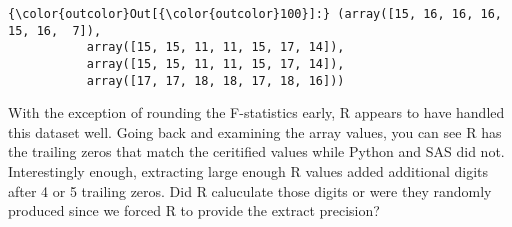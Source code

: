 \documentclass{article}
\begin{document}
            \begin{Verbatim}[commandchars=\\\{\}]
{\color{outcolor}Out[{\color{outcolor}100}]:} (array([15, 16, 16, 16, 15, 16,  7]),
           array([15, 15, 11, 11, 15, 17, 14]),
           array([15, 15, 11, 11, 15, 17, 14]),
           array([17, 17, 18, 18, 17, 18, 16]))
\end{Verbatim}
        
    With the exception of rounding the F-statistics early, R appears to have
handled this dataset well. Going back and examining the array values,
you can see R has the trailing zeros that match the ceritified values
while Python and SAS did not. Interestingly enough, extracting large
enough R values added additional digits after 4 or 5 trailing zeros. Did
R caluculate those digits or were they randomly produced since we forced
R to provide the extract precision?
\end{document}
